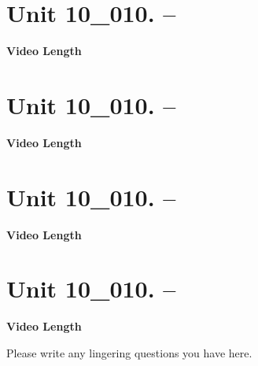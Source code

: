 \documentclass[letterpaper,12pt]{exam}
\newcommand{\unit}{Unit 10}
\begin{document}
\begin{questions}
\section*{\unit\_010. -- } 
\par{\selectfont\textbf{Video Length }}

\section*{\unit\_010. -- } 
\par{\selectfont\textbf{Video Length }}

\section*{\unit\_010. -- } 
\par{\selectfont\textbf{Video Length }}

\section*{\unit\_010. -- } 
\par{\selectfont\textbf{Video Length }}



Please write any lingering questions you have here.


\end{questions}
\end{document}
